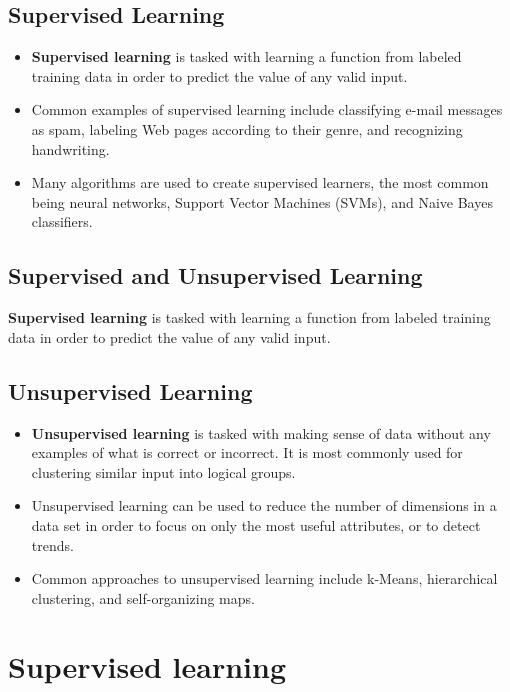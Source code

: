 \documentclass[]{report}
\begin{document}

\subsection*{Supervised Learning}
\begin{itemize}
\item \textbf{Supervised learning} is tasked with learning a function from labeled training data in order to predict the value of any valid input. 

\item Common examples of supervised learning include classifying e-mail messages as spam, labeling Web pages according to their genre, and recognizing handwriting. 
\item Many algorithms are used to create supervised learners, the most common being neural networks, Support Vector Machines (SVMs), and Naive Bayes classifiers.
\end{itemize}

\subsection*{Supervised and Unsupervised Learning}
\textbf{Supervised learning} is tasked with learning a function from labeled training data in order to predict the value of any valid input. 


\subsection*{Unsupervised Learning}
\begin{itemize}
	\item
\textbf{Unsupervised learning} is tasked with making sense of data without any examples of what is correct or incorrect. It is most commonly used for clustering similar input into logical groups. 
\item Unsupervised learning  can be used to reduce the number of dimensions in a data set in order to focus on only the most useful attributes, or to detect trends. 

\item Common approaches to unsupervised learning include k-Means, hierarchical clustering, and self-organizing maps.
\end{itemize}
\section{Supervised learning}
\end{document}
